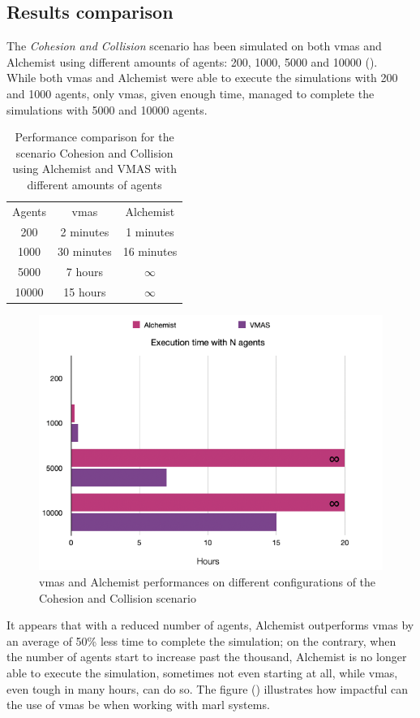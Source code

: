 \documentclass[12pt,a4paper,openright,twoside]{book}
\begin{document}
\subsection{Results comparison}
The \emph{Cohesion and Collision} scenario has been simulated on both \ac{vmas} and Alchemist using different amounts of agents: 200, 1000, 5000 and 10000 ().\\
While both \ac{vmas} and Alchemist were able to execute the simulations with 200 and 1000 agents, only \ac{vmas}, given enough time, managed to complete the simulations with 5000 and 10000 agents.
\begin{table}
    \caption{Performance comparison for the scenario Cohesion and Collision using Alchemist and VMAS with different amounts of agents}
\begin{center}
    \begin{tabular}{ |c|c|c| } 
     \hline
     Agents & \ac{vmas} & Alchemist \\ 
     200 & 2 minutes & 1 minutes \\ 
     1000 & 30 minutes & 16 minutes \\ 
     5000 & 7 hours & $\infty$ \\ 
     10000 & 15 hours & $\infty$ \\ 
     \hline
    \end{tabular}
    \label{tab:comparison}
\end{center}
\end{table}
\begin{figure}[t]
    \centering
    \includegraphics[width=\textwidth]{img/cohandcoll-vmas-alchemist.png}
    \caption{\ac{vmas} and Alchemist performances on different configurations of the Cohesion and Collision scenario}
    \label{fig:cohandcoll-vmas-alchemist}
\end{figure}
It appears that with a reduced number of agents, Alchemist outperforms \ac{vmas} by an average of 50\% less time to complete the simulation; on the contrary, when the number of agents start to increase past the thousand, Alchemist is no longer able to execute the simulation, sometimes not even starting at all, while \ac{vmas}, even tough in many hours, can do so.
The figure () illustrates how impactful can the use of \ac{vmas} be when working with \ac{marl} systems.
\end{document}
